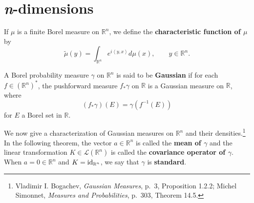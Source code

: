 \documentclass{article}
\newcommand{\inner}[2]{\left\langle #1, #2 \right\rangle}
\newcommand{\id}{\ensuremath\mathrm{id}}
\theoremstyle{definition}
\begin{document}
\section{{\em n}-dimensions}
If $\mu$ is a finite Borel measure on $\mathbb{R}^n$, we define the \textbf{characteristic function of
$\mu$} by
\[
\widetilde{\mu}(y) = \int_{\mathbb{R}^n} e^{i\inner{y}{x}} d\mu(x), \qquad y \in \mathbb{R}^n.
\]

A Borel probability measure $\gamma$ on $\mathbb{R}^n$ is said to be \textbf{Gaussian} if
for each $f \in (\mathbb{R}^n)^*$, the pushforward measure
$f_* \gamma$ on $\mathbb{R}$ is a Gaussian measure on $\mathbb{R}$, where
\[
(f_* \gamma)(E)=\gamma(f^{-1}(E))
\]
 for $E$ a Borel set in
$\mathbb{R}$.

We now give a characterization of Gaussian measures on $\mathbb{R}^n$ and their densities.\footnote{Vladimir I. Bogachev,
{\em Gaussian Measures}, p.~3, Proposition 1.2.2; Michel Simonnet, {\em Measures and Probabilities},
p.~303, Theorem 14.5.} In the following theorem, the
vector $a \in \mathbb{R}^n$  is called the \textbf{mean of $\gamma$} and the 
linear transformation $K \in \mathscr{L}(\mathbb{R}^n)$ 
 is called the \textbf{covariance  operator of $\gamma$}. When $a=0 \in \mathbb{R}^n$ and $K=\id_{\mathbb{R}^n}$, we
 say that $\gamma$ is \textbf{standard}.
\end{document}
